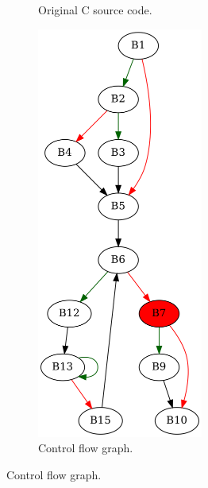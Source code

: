 \begin{figure}[htbp]
	\centering
	\begin{subfigure}[b]{0.30\textwidth}
		\centering
		
		\caption{Original C source code.}
	\end{subfigure}
	\begin{subfigure}[b]{0.50\textwidth}
		\centering
		\includegraphics[width=0.6\textwidth]{inc/appendices/examples/interval/example/sample/f_0001b.png}
		\caption{Control flow graph.}
	\end{subfigure}
\end{figure}

